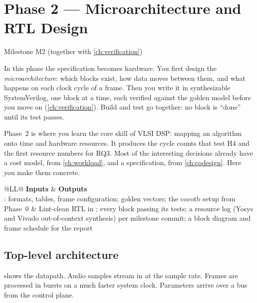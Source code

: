 \chapter{Phase 2 --- Microarchitecture and RTL Design}\label{ch:rtl}

 \quad Milestone M2 (together with \cref{ch:verification})

In this phase the specification becomes hardware. You first design the
\emph{microarchitecture}: which blocks exist, how data moves between them, and
what happens on each clock cycle of a frame. Then you write it in synthesizable
SystemVerilog, one block at a time, each verified against the golden model
before you move on (\cref{ch:verification}). Build and test go together: no
block is \enquote{done} until its test passes.

\begin{whybox}
Phase~2 is where you learn the core skill of VLSI DSP: mapping an algorithm onto
time and hardware resources. It produces the cycle counts that test H4 and the
first resource numbers for RQ3. Most of the interesting decisions already have
a cost model, from \cref{ch:workload}, and a specification, from
\cref{ch:codesign}. Here you make them concrete.
\end{whybox}

\begin{center}\small
\begin{tabularx}{\textwidth}{@{}LL@{}}
\toprule
\textbf{Inputs} & \textbf{Outputs} \\
\midrule
{}: formats, tables, frame configuration; golden vectors; the
cocotb setup from Phase~0
& Lint-clean RTL in ; every block passing its tests; a resource log
(Yosys and Vivado out-of-context synthesis) per milestone commit; a block
diagram and frame schedule for the report \\
\bottomrule
\end{tabularx}
\end{center}

\section{Top-level architecture}\label{sec:rtl:arch}

 shows the datapath. Audio samples stream in at the sample
rate. Frames are processed in bursts on a much faster system clock. Parameters
arrive over a bus from the control plane.


